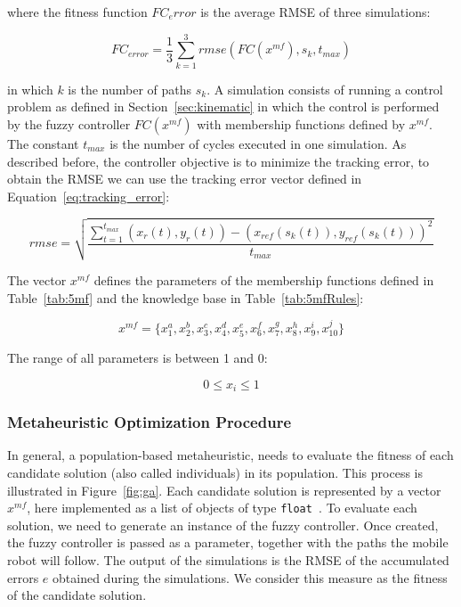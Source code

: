 \documentclass[symmetry,article,submit,moreauthors,pdftex]{Definitions/mdpi}
\begin{document}
where the fitness function $FC_error$ is the average RMSE of three simulations:

\begin{equation}
  FC_{error} = \frac{1}{3} \sum_{k=1}^3 rmse(FC(x^{mf}), s_k, t_{max}) 
\end{equation}

in which $k$ is the number of paths $s_k$. A simulation consists of running a control problem as 
defined in Section~\ref{sec:kinematic} in which the control is
performed by the fuzzy controller $FC(x^{mf})$ with membership functions
defined by $x^{mf}$. The constant $t_{max}$ is the number of cycles executed in one simulation.
As described before, the controller objective is to minimize the tracking error, 
to obtain the RMSE we can use the tracking error vector defined in Equation~\ref{eq:tracking_error}:

\begin{equation}\label{eq:tracking_error}
 rmse = \sqrt{\frac{\sum_{t=1}^{t_{max}} (x_r(t),y_r(t))-(x_{ref}(s_k(t)),y_{ref}(s_k(t)))^2}{t_{max}}}
\end{equation}

The vector $x^{mf}$ defines the parameters of the membership functions defined in Table~\ref{tab:5mf} 
and the knowledge base in Table~\ref{tab:5mfRules}: 

\begin{equation}\label{eq:mfs}
 x^{mf} = \{x_1^a, x_2^b, x_3^c, x_4^d, x_5^e, x_6^f, x_7^g, x_8^h, x_9^i, x_{10}^j\}
\end{equation}

The range of all parameters is between 1 and 0: 

\begin{equation}\label{eq:mfs}
  0 \leq x_i \leq 1
\end{equation}


\subsubsection{Metaheuristic Optimization Procedure}\label{sec:GAO}

In general, a population-based metaheuristic, needs to evaluate the fitness of
each candidate solution (also called individuals) in its population. This
process is illustrated in Figure~\ref{fig:ga}. Each candidate solution is
represented by a vector $x^{mf}$, here implemented as a list of objects of type {
\tt float }. To evaluate each solution, we need to generate an instance of the
fuzzy controller. Once created, the fuzzy controller is passed as a
parameter, together with the paths the mobile robot will follow. The output of
the simulations is the RMSE of the accumulated errors $e$ obtained during the
simulations. We consider this measure as the fitness of the candidate solution.
\end{document}
